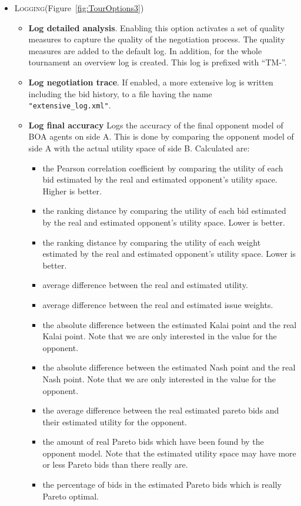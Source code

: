 \documentclass[]{article}
\begin{document}
\begin{itemize}
	\item \textsc{Logging}(Figure~\ref{fig:TourOptions3})
	\begin{itemize}
		\item \textbf{Log detailed analysis}. Enabling this option activates a set of quality measures to capture the quality of the negotiation process. The quality measures are added to the default log. In addition, for the whole tournament an overview log is created. This log is prefixed with ``TM-''.
		\item \textbf{Log negotiation trace}. If enabled, a more extensive log is written including the bid history, to a file having the name {\tt "extensive\_log.xml"}. 
		\item \textbf{Log final accuracy} Logs the accuracy of the final opponent model of BOA agents on side A. This is done by comparing the opponent model of side A with the actual utility space of side B. Calculated are:
		\begin{itemize}
		\item the Pearson correlation coefficient by comparing the utility of each bid estimated by the real and estimated opponent's utility space. Higher is better.
		\item the ranking distance by comparing the utility of each bid estimated by the real and estimated opponent's utility space. Lower is better.
		\item the ranking distance by comparing the utility of each weight estimated by the real and estimated opponent's utility space. Lower is better.
		\item average difference between the real and estimated utility.
		\item average difference between the real and estimated issue weights.
		\item the absolute difference between the estimated Kalai point and the real Kalai point. Note that we are only interested in the value for the opponent.
		\item the absolute difference between the estimated Nash point and the real Nash point. Note that we are only interested in the value for the opponent.
		\item the average difference between the real estimated pareto bids and their estimated utility for the opponent.
		\item the amount of real Pareto bids which have been found by the opponent model. Note that the estimated utility space may have more or less Pareto bids than there really are.
		\item the percentage of bids in the estimated Pareto bids which is really Pareto optimal.

\end{itemize}
\end{itemize}
\end{itemize}
\end{document}

